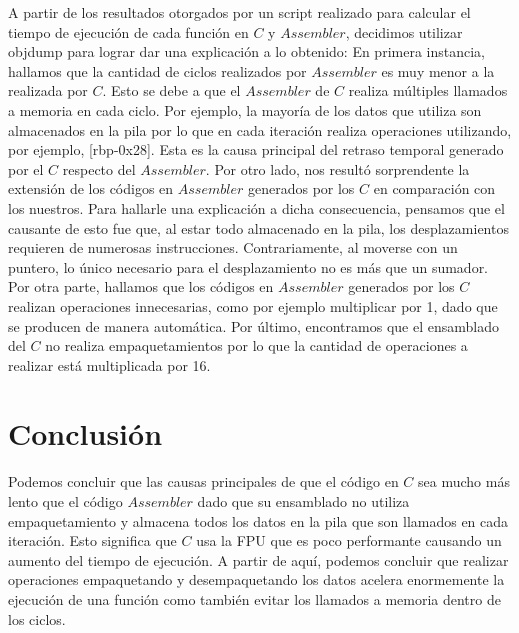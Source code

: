 \documentclass[10pt, a4paper]{article}
\begin{document}
A partir de los resultados otorgados por un script realizado para calcular el tiempo de ejecución de cada función en $C$ y $Assembler$, decidimos utilizar objdump para lograr dar una explicación a lo obtenido:\newline
En primera instancia, hallamos que la cantidad de ciclos realizados por $Assembler$ es muy menor a la realizada por $C$. Esto se debe a que el $Assembler$ de $C$ realiza múltiples llamados a memoria en cada ciclo. Por ejemplo, la mayoría de los datos que utiliza son almacenados en la pila por lo que en cada iteración realiza operaciones utilizando, por ejemplo, [rbp-0x28]. Esta es la causa principal del retraso temporal generado por el $C$ respecto del $Assembler$. \newline 
Por otro lado, nos resultó sorprendente la extensión de los códigos en $Assembler$ generados por los $C$ en comparación con los nuestros. Para hallarle una explicación a dicha consecuencia, pensamos que el causante de esto fue que, al estar todo almacenado en la pila, los desplazamientos requieren de numerosas instrucciones. Contrariamente, al moverse con un puntero, lo único necesario para el desplazamiento no es más que un sumador. \newline
Por otra parte, hallamos que los códigos en $Assembler$ generados por los $C$ realizan operaciones innecesarias, como por ejemplo multiplicar por 1, dado que se producen de manera automática.\newline
Por último, encontramos que el ensamblado del $C$ no realiza empaquetamientos por lo que la cantidad de operaciones a realizar está multiplicada por 16.\newline

\section{Conclusi\'on}
Podemos concluir que las causas principales de que el código en $C$ sea mucho más lento que el código $Assembler$ dado que su ensamblado no utiliza empaquetamiento y almacena todos los datos en la pila que son llamados en cada iteración. Esto significa que $C$ usa la FPU que es poco performante causando un aumento del tiempo de ejecución.\newline
A partir de aquí, podemos concluir que realizar operaciones empaquetando y desempaquetando los datos acelera enormemente la ejecución de una función como también evitar los llamados a memoria dentro de los ciclos.
\end{document}
